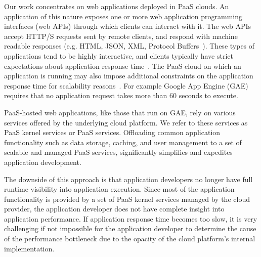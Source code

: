

Our work concentrates on web
applications deployed in PaaS clouds. An application of this nature exposes
one or more web application programming interfaces (web APIs) through which
clients can interact with it. The web APIs accept HTTP/S requests sent by
remote clients, and respond with machine readable responses (e.g. HTML, JSON,
XML, Protocol Buffers~\cite{protobuff}). These types of applications tend to be highly
interactive, and clients typically have strict expectations about application
response time~\cite{latency-matters}. 
The PaaS cloud on
which an application is running may also impose additional constraints on the
application response time for scalability
reasons~\cite{azure-limits,gae-limits}.  For example Google App Engine (GAE)~\cite{gae}
requires that no application request takes more than 60 seconds to execute.

PaaS-hosted web applications, like those that run on GAE,  
rely on various services offered by the underlying
cloud platform. We refer to these services as PaaS kernel services or PaaS
services.
Offloading common application functionality such as data storage, caching,
and user management to a set of scalable and
managed PaaS services, significantly simplifies and expedites
application development.

The downside of this approach is that application developers no longer have full runtime visibility
into application execution. Since most of the application functionality is provided by a set 
of PaaS kernel services managed by the cloud provider, the application
developer does not have complete insight into application performance. 
If application 
response time becomes too slow, it is very challenging if not impossible
for the application developer to determine
the cause of the performance bottleneck due to the opacity of the cloud
platform's internal implementation. 

